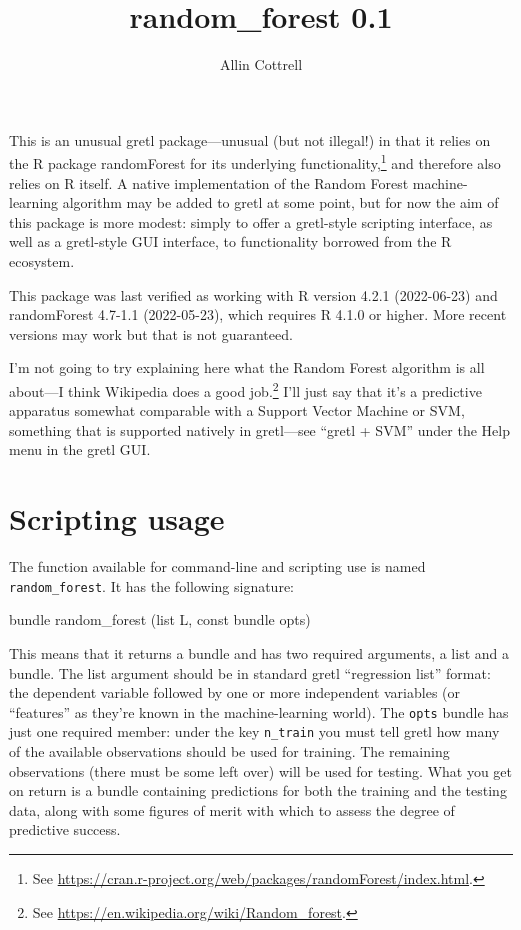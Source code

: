 \documentclass{article}
\begin{document}
\setlength{\parindent}{0pt}
\setlength{\parskip}{1ex}

\title{random\_forest 0.1}
\author{Allin Cottrell}
\maketitle

This is an unusual gretl package---unusual (but not illegal!) in that
it relies on the \textsf{R} package \textsf{randomForest} for its
underlying functionality,\footnote{See
  \url{https://cran.r-project.org/web/packages/randomForest/index.html}.}
and therefore also relies on \textsf{R} itself. A native
implementation of the Random Forest machine-learning algorithm may be
added to gretl at some point, but for now the aim of this package is
more modest: simply to offer a gretl-style scripting interface, as
well as a gretl-style GUI interface, to functionality borrowed from
the \textsf{R} ecosystem.

This package was last verified as working with \textsf{R} version
4.2.1 (2022-06-23) and \textsf{randomForest} 4.7-1.1 (2022-05-23),
which requires \textsf{R} 4.1.0 or higher. More recent versions may
work but that is not guaranteed.

I'm not going to try explaining here what the Random Forest algorithm
is all about---I think Wikipedia does a good job.\footnote{See
  \url{https://en.wikipedia.org/wiki/Random_forest}.} I'll just say
that it's a predictive apparatus somewhat comparable with a Support
Vector Machine or SVM, something that is supported natively in
gretl---see ``gretl + SVM'' under the \textsf{Help} menu in the gretl
GUI.

\section{Scripting usage}

The function available for command-line and scripting use is named
\texttt{random\_forest}. It has the following signature:
%
\begin{code}
bundle random_forest (list L, const bundle opts)
\end{code}
%
This means that it returns a bundle and has two required arguments, a
list and a bundle. The list argument should be in standard gretl
``regression list'' format: the dependent variable followed by one or
more independent variables (or ``features'' as they're known in the
machine-learning world). The \texttt{opts} bundle has just one
required member: under the key \texttt{n\_train} you must tell gretl
how many of the available observations should be used for training.
The remaining observations (there must be some left over) will be used
for testing. What you get on return is a bundle containing predictions
for both the training and the testing data, along with some figures of
merit with which to assess the degree of predictive success.
\end{document}
